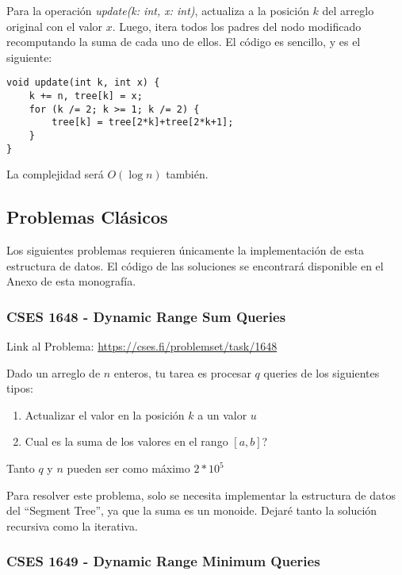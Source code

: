 \documentclass{article}
\begin{document}
Para la operación \textit{update(k: int, x: int)}, actualiza a la posición $k$ del arreglo original con el valor $x$. Luego, itera todos los padres del nodo modificado recomputando la suma de cada uno de ellos. El código es sencillo, y es el siguiente:

\begin{verbatim}
void update(int k, int x) {
    k += n, tree[k] = x;
    for (k /= 2; k >= 1; k /= 2) {
        tree[k] = tree[2*k]+tree[2*k+1];
    }
}
\end{verbatim}

La complejidad será $O(\log n)$ también.

\subsection{Problemas Clásicos}

Los siguientes problemas requieren únicamente la implementación de esta estructura de datos. El código de las soluciones se encontrará disponible en el Anexo de esta monografía.

\subsubsection{CSES 1648 - Dynamic Range Sum Queries}

Link al Problema: \href{https://cses.fi/problemset/task/1648}{https://cses.fi/problemset/task/1648}

\begin{tcolorbox}
Dado un arreglo de $n$ enteros, tu tarea es procesar $q$ queries de los siguientes tipos:
\begin{enumerate}
    \item Actualizar el valor en la posición $k$ a un valor $u$
    \item Cual es la suma de los valores en el rango $[a,b]$?
\end{enumerate}
Tanto $q$ y $n$ pueden ser como máximo $2*10^5$
\end{tcolorbox}

Para resolver este problema, solo se necesita implementar la estructura de datos del ``Segment Tree'', ya que la suma es un monoide. Dejaré tanto la solución recursiva como la iterativa.

\subsubsection{CSES 1649 - Dynamic Range Minimum Queries}
\end{document}
